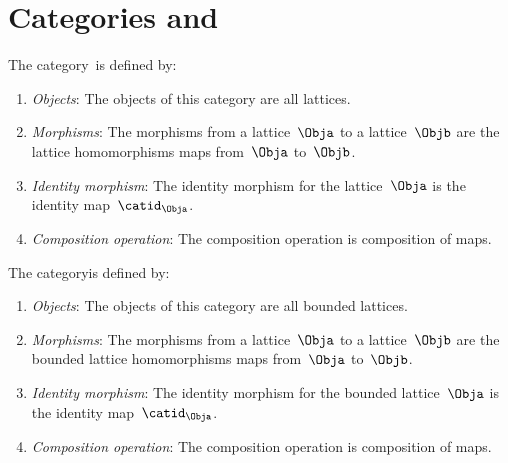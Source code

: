 \section{Categories \Lat and \BoundedLat}
\begin{ctdefinition}
    \label{def:Lat}
    The category~\Lat is defined by:
    \begin{enumerate}
        \item \emph{Objects}: The objects of this category are all lattices.
        \item \emph{Morphisms}: The morphisms from a lattice~$\Obja$ to a lattice~$\Objb$ are the lattice homomorphisms maps from~$\Obja$ to~$\Objb$.
        \item \emph{Identity morphism}: The identity morphism for the lattice~$\Obja$
              is the identity map~$\catid_\Obja$.
        \item \emph{Composition operation}: The composition operation is composition of maps.
    \end{enumerate}
\end{ctdefinition}

\begin{ctdefinition}
    \label{def:BoundedLat}
    The category\BoundedLat is defined by:
    \begin{enumerate}
        \item \emph{Objects}: The objects of this category are all bounded lattices.
        \item \emph{Morphisms}: The morphisms from a lattice~$\Obja$ to a lattice~$\Objb$ are the bounded lattice homomorphisms maps from~$\Obja$ to~$\Objb$.
        \item \emph{Identity morphism}: The identity morphism for the bounded lattice~$\Obja$
              is the identity map~$\catid_\Obja$.
        \item \emph{Composition operation}: The composition operation is composition of maps.
    \end{enumerate}
\end{ctdefinition}

